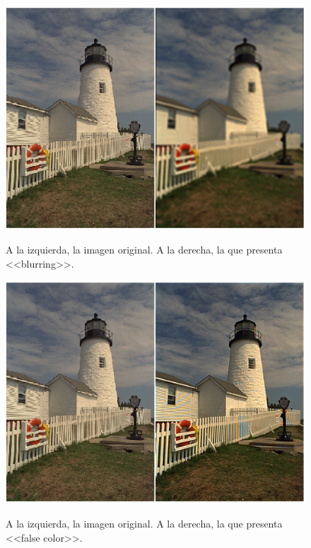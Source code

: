 \documentclass[a4paper]{article}
\begin{document}
\begin{figure}[h!]
	\caption{A la izquierda, la imagen original. A la derecha, la que presenta <<blurring>>.}
	\begin{center}
	\includegraphics[scale=0.66]{imagenes/blurring}
	\label{blurring}
  \end{center}
\end{figure}

\begin{figure}[h!]
	\caption{A la izquierda, la imagen original. A la derecha, la que presenta <<false color>>.}
	\begin{center}
	\includegraphics[scale=0.66]{imagenes/false}
	\label{false}
  \end{center}
\end{figure}
\end{document}

